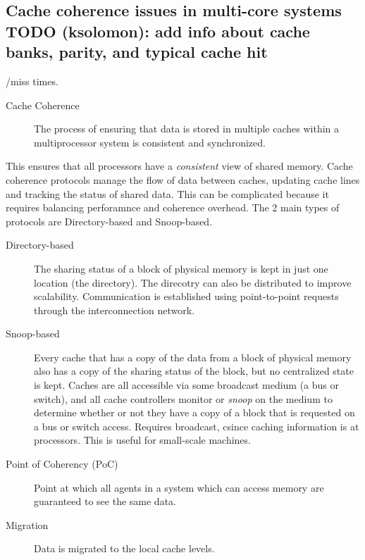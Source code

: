 \documentclass{article}
\begin{document}
\subsection{ Cache coherence issues in multi-core systems TODO (ksolomon): add info about cache banks, parity, and typical cache hit}/miss times.
\begin{description}
	\item[Cache Coherence]
	      The process of ensuring that data is stored in multiple caches within a multiprocessor system is consistent and synchronized.
\end{description}
This ensures that all processors have a \textit{consistent} view of shared memory. Cache coherence protocols manage the flow of data between caches, updating cache lines and tracking the status of shared data. This can be complicated because it requires balancing perforamnce and coherence overhead. The 2 main types of protocols are Directory-based and Snoop-based.
\begin{description}
	\item[Directory-based]
	      The sharing status of a block of physical memory is kept in just one location (the directory). The direcotry can also be distributed to improve scalability. Communication is established using point-to-point requests through the interconnection network.
\end{description}
\begin{description}
	\item[Snoop-based]
	      Every cache that has a copy of the data from a block of physical memory also has a copy of the sharing status of the block, but no centralized state is kept. Caches are all accessible via some broadcast medium (a bus or switch), and all cache controllers monitor or \textit{snoop} on the medium to determine whether or not they have a copy of a block that is requested on a bus or switch access. Requires broadcast, csince caching information is at processors. This is useful for small-scale machines.
\end{description}
\begin{description}
	\item[Point of Coherency (PoC)]
	      Point at which all agents in a system which can access memory are guaranteed to see the same data.
\end{description}
\begin{description}
	\item[Migration]
	      Data is migrated to the local cache levels.
\end{description}
\end{document}
